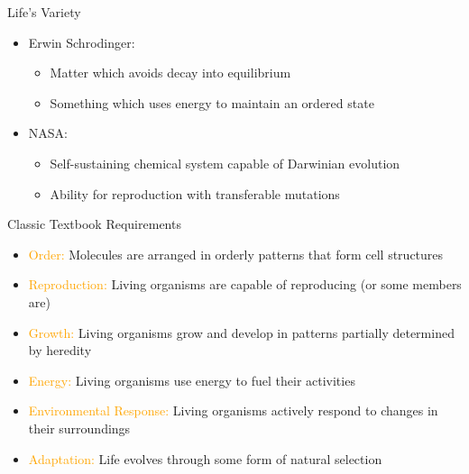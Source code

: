 \documentclass[pdf,aspectratio=169]{beamer}
\begin{document}
\begin{frame}{Life's Variety}
  \begin{itemize}
	\item Erwin Schrodinger:
	  \begin{itemize}
		\item \alert{Matter which avoids decay into equilibrium}
		\item Something which uses energy to maintain an ordered state
	  \end{itemize}
	\item NASA:
	  \begin{itemize}
		\item \alert{Self-sustaining chemical system capable of Darwinian evolution}
		\item Ability for reproduction with transferable mutations
	  \end{itemize}
  \end{itemize}
\end{frame}

\begin{frame}{Classic Textbook Requirements}
  \begin{center}
	\begin{itemize}
	  \item \textcolor{Orange}{Order:} Molecules are arranged in orderly patterns that form cell structures
	  \item \textcolor{Orange}{Reproduction:} Living organisms are capable of reproducing (or some members are)
	  \item \textcolor{Orange}{Growth:} Living organisms grow and develop in patterns partially determined by heredity
	  \item \textcolor{Orange}{Energy:} Living organisms use energy to fuel their activities
	  \item \textcolor{Orange}{Environmental Response:} Living organisms actively respond to changes in their surroundings
	  \item \textcolor{Orange}{Adaptation:} Life evolves through some form of natural selection
	\end{itemize}
  \end{center}
\end{frame}
\end{document}
